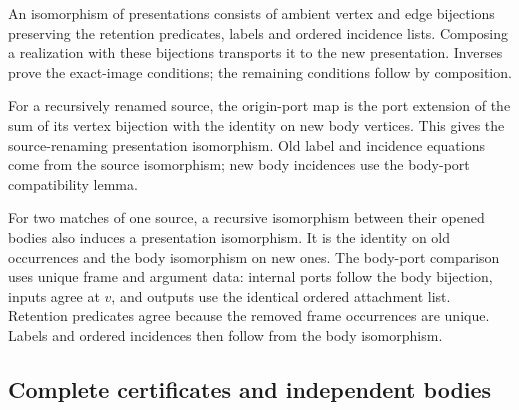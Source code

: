



An isomorphism of presentations consists of ambient vertex and edge
bijections preserving the retention predicates, labels and ordered incidence
lists. Composing a realization with these bijections transports it to the
new presentation. Inverses prove the exact-image conditions; the remaining
conditions follow by composition.



For a recursively renamed source, the origin-port map is the port extension
of the sum of its vertex bijection with the identity on new body vertices.
This gives the source-renaming presentation isomorphism. Old label and
incidence equations come from the source isomorphism; new body incidences use
the body-port compatibility lemma.



For two matches of one source, a recursive isomorphism between their opened
bodies also induces a presentation isomorphism. It is the identity on old
occurrences and the body isomorphism on new ones. The body-port comparison
uses unique frame and argument data: internal ports follow the body bijection,
inputs agree at $v$, and outputs use the identical ordered attachment list.
Retention predicates agree because the removed frame occurrences are unique.
Labels and ordered incidences then follow from the body isomorphism.



\subsection{Complete certificates and independent bodies}

